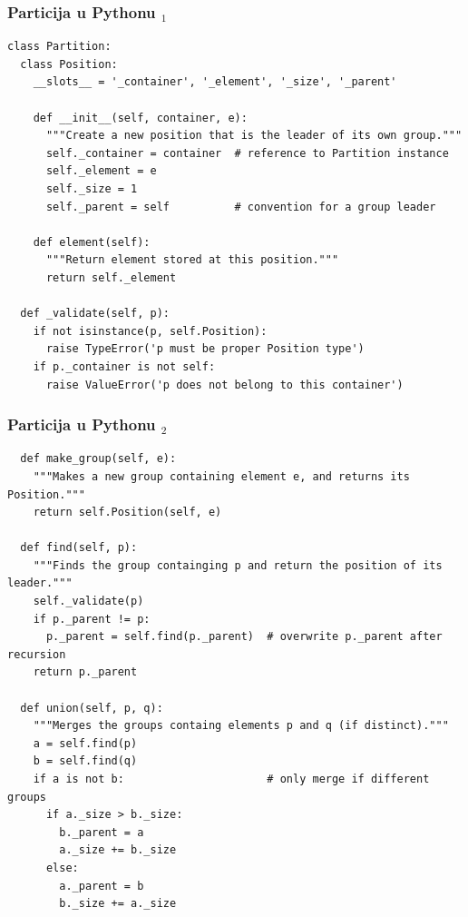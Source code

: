 \documentclass[compress,aspectratio=169]{beamer}
\begin{document}
\begin{frame}
  \frametitle{Particija u Pythonu $_1$}
\begin{verbatim}
class Partition:
  class Position:
    __slots__ = '_container', '_element', '_size', '_parent'

    def __init__(self, container, e):
      """Create a new position that is the leader of its own group."""
      self._container = container  # reference to Partition instance
      self._element = e
      self._size = 1
      self._parent = self          # convention for a group leader

    def element(self):
      """Return element stored at this position."""
      return self._element

  def _validate(self, p):
    if not isinstance(p, self.Position):
      raise TypeError('p must be proper Position type')
    if p._container is not self:
      raise ValueError('p does not belong to this container')
\end{verbatim}
\end{frame}

\begin{frame}
  \frametitle{Particija u Pythonu $_2$}
\begin{verbatim}
  def make_group(self, e):
    """Makes a new group containing element e, and returns its Position."""
    return self.Position(self, e)

  def find(self, p):
    """Finds the group containging p and return the position of its leader."""
    self._validate(p)
    if p._parent != p:
      p._parent = self.find(p._parent)  # overwrite p._parent after recursion
    return p._parent
    
  def union(self, p, q):
    """Merges the groups containg elements p and q (if distinct)."""
    a = self.find(p)
    b = self.find(q)
    if a is not b:                      # only merge if different groups
      if a._size > b._size:
        b._parent = a
        a._size += b._size
      else:
        a._parent = b
        b._size += a._size
\end{verbatim}
\end{frame}
\end{document}
